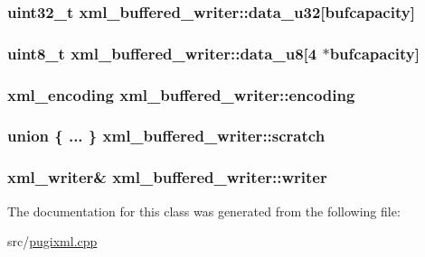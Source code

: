 \hypertarget{classxml__buffered__writer_afa54826d8227c4ee661e1a9cc1e1acf2}{
\subsubsection[{data\_\-u32}]{\setlength{\rightskip}{0pt plus 5cm}uint32\_\-t {\bf xml\_\-buffered\_\-writer::data\_\-u32}\mbox{[}bufcapacity\mbox{]}}}
\label{classxml__buffered__writer_afa54826d8227c4ee661e1a9cc1e1acf2}
\hypertarget{classxml__buffered__writer_ac672c70ba0597cf94d35c352ac563891}{
\subsubsection[{data\_\-u8}]{\setlength{\rightskip}{0pt plus 5cm}uint8\_\-t {\bf xml\_\-buffered\_\-writer::data\_\-u8}\mbox{[}4 $\ast$bufcapacity\mbox{]}}}
\label{classxml__buffered__writer_ac672c70ba0597cf94d35c352ac563891}
\hypertarget{classxml__buffered__writer_ab810a7286598172e1549561b285f08fb}{
\subsubsection[{encoding}]{\setlength{\rightskip}{0pt plus 5cm}xml\_\-encoding {\bf xml\_\-buffered\_\-writer::encoding}}}
\label{classxml__buffered__writer_ab810a7286598172e1549561b285f08fb}
\hypertarget{classxml__buffered__writer_a74fd3d695095835afa0f7671ac33037c}{
\subsubsection[{scratch}]{\setlength{\rightskip}{0pt plus 5cm}union \{ ... \}   {\bf xml\_\-buffered\_\-writer::scratch}}}
\label{classxml__buffered__writer_a74fd3d695095835afa0f7671ac33037c}
\hypertarget{classxml__buffered__writer_a37cdd45f867937e1978565f5a0fa318b}{
\subsubsection[{writer}]{\setlength{\rightskip}{0pt plus 5cm}xml\_\-writer\& {\bf xml\_\-buffered\_\-writer::writer}}}
\label{classxml__buffered__writer_a37cdd45f867937e1978565f5a0fa318b}


The documentation for this class was generated from the following file:\begin{DoxyCompactItemize}
\item 
src/\hyperlink{pugixml_8cpp}{pugixml.cpp}\end{DoxyCompactItemize}
